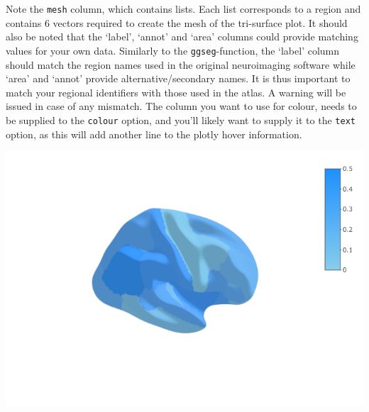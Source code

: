 \documentclass[fleqn,10pt]{wlpeerj} %
\newenvironment{Shaded}{\begin{snugshade}}{\end{snugshade}}
\newcommand{\DataTypeTok}[1]{\textcolor[rgb]{0.13,0.29,0.53}{#1}}
\newcommand{\DecValTok}[1]{\textcolor[rgb]{0.00,0.00,0.81}{#1}}
\newcommand{\KeywordTok}[1]{\textcolor[rgb]{0.13,0.29,0.53}{\textbf{#1}}}
\newcommand{\NormalTok}[1]{#1}
\newcommand{\OperatorTok}[1]{\textcolor[rgb]{0.81,0.36,0.00}{\textbf{#1}}}
\newcommand{\StringTok}[1]{\textcolor[rgb]{0.31,0.60,0.02}{#1}}
\begin{document}
Note the \texttt{mesh} column, which contains lists.
Each list corresponds to a region and contains 6 vectors required to create the mesh of the tri-surface plot.
It should also be noted that the `label', `annot' and `area' columns could provide matching values for your own data.
Similarly to the \texttt{ggseg}-function, the `label' column should match the region names used in the original neuroimaging software while `area' and `annot' provide alternative/secondary names.
It is thus important to match your regional identifiers with those used in the atlas.
A warning will be issued in case of any mismatch.
The column you want to use for colour, needs to be supplied to the \texttt{colour} option, and you'll likely want to supply it to the \texttt{text} option, as this will add another line to the plotly hover information.

\begin{Shaded}
\end{Shaded}

\includegraphics[width=0.4\linewidth]{png/ggseg3d_data}
\end{document}
